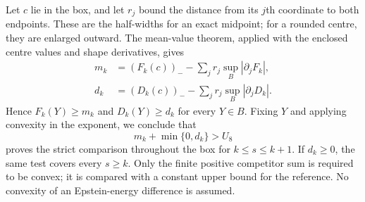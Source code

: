 \documentclass[reqno,english]{amsart}
\theoremstyle{definition}
\newtheorem{open problem}[theorem]{Open Problem}
\theoremstyle{remark}
\theoremstyle{plain}
\numberwithin{equation}{section}
\begin{document}
Let $c$ lie in the box, and let $r_j$ bound the distance from its
$j$th coordinate to both endpoints. These are the half-widths for
an exact midpoint; for a rounded centre, they are enlarged outward.
The mean-value theorem, applied with the enclosed centre values and
shape derivatives, gives
\begin{align}
 m_k&=(F_k(c))_- -\sum_jr_j\sup_B|\partial_jF_k|,\nonumber\\
 d_k&=(D_k(c))_- -\sum_jr_j\sup_B|\partial_jD_k|.
 \label{E:eq:power-mean-bounds}
\end{align}
Hence $F_k(Y)\ge m_k$ and $D_k(Y)\ge d_k$ for every
$Y\in B$. Fixing $Y$ and applying convexity in the exponent,
we conclude that
\begin{equation}
  m_k+\min\{0,d_k\}>U_8
 \label{E:eq:power-mvt-certificate}
\end{equation}
proves the strict comparison throughout the box for
$k\le s\le k+1$. If $d_k\ge0$, the same test covers every
$s\ge k$. Only the finite positive competitor sum is required to
be convex; it is compared with a constant upper bound for the
reference. No convexity of an Epstein-energy difference is assumed.
\end{document}

